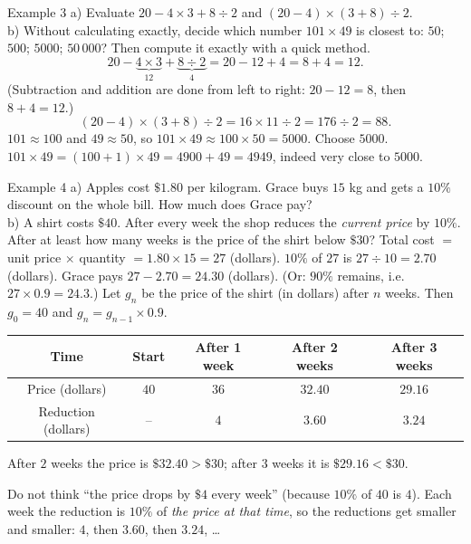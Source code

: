 \begin{exbox}{Example 3}
a) Evaluate $20 - 4\times 3 + 8 \div 2$ \quad and \quad $(20-4)\times(3+8) \div 2$.\\
b) Without calculating exactly, decide which number $101 \times 49$ is closest to: $50$; $500$; $5000$; $50\,000$? Then
compute it exactly with a quick method.
\guide
{}
\[ 20 - \underbrace{4\times 3}_{12} + \underbrace{8 \div 2}_{4} = 20 - 12 + 4 = 8 + 4 = 12. \]
(Subtraction and addition are done from left to right: $20 - 12 = 8$, then $8 + 4 = 12$.)
\[ (20 - 4)\times(3+8) \div 2 = 16 \times 11 \div 2 = 176 \div 2 = 88. \]
$101 \approx 100$ and $49 \approx 50$, so $101 \times 49 \approx 100\times 50 = 5000$. Choose $5000$.
$101 \times 49 = (100 + 1)\times 49 = 4900 + 49 = 4949$, indeed very close to $5000$.
\end{exbox}

\begin{exbox}{Example 4}
a) Apples cost $\$1.80$ per kilogram. Grace buys $15$ kg and gets a $10\%$ discount on the whole bill. How much
does Grace pay?\\
b) A shirt costs $\$40$. After every week the shop reduces the \emph{current price} by $10\%$. After at least how
many weeks is the price of the shirt below $\$30$?
\guide
{}
Total cost $=$ unit price $\times$ quantity $= 1.80 \times 15 = 27$ (dollars).
$10\%$ of $27$ is $27 \div 10 = 2.70$ (dollars). Grace pays $27 - 2.70 = 24.30$ (dollars).
(Or: $90\%$ remains, i.e.\ $27 \times 0.9 = 24.3$.)
Let $g_n$ be the price of the shirt (in dollars) after $n$ weeks. Then $g_0 = 40$ and $g_{n} = g_{n-1}\times 0.9$.
\begin{center}
\begin{tabular}{|c|c|c|c|c|}
\hline
\rowcolor{tmBlue!10} Time & Start & After 1 week & After 2 weeks & After 3 weeks\\ \hline
Price (dollars) & $40$ & $36$ & $32.40$ & $29.16$\\ \hline
Reduction (dollars) & -- & $4$ & $3.60$ & $3.24$\\ \hline
\end{tabular}
\end{center}
After $2$ weeks the price is $\$32.40 > \$30$; after $3$ weeks it is $\$29.16 < \$30$.
\begin{warnbox}
Do not think ``the price drops by $\$4$ every week'' (because $10\%$ of $40$ is $4$). Each week the reduction is
$10\%$ of \emph{the price at that time}, so the reductions get smaller and smaller: $4$, then $3.60$, then $3.24$, \ldots
\end{warnbox}
\end{exbox}

